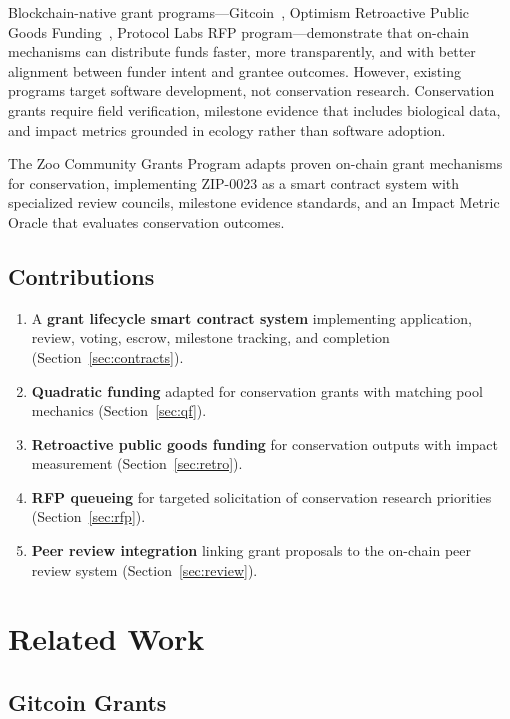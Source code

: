 \documentclass[11pt,letterpaper]{article}
\begin{document}
Blockchain-native grant programs---Gitcoin~\cite{gitcoin2023}, Optimism Retroactive Public Goods Funding~\cite{optimism2023retropgf}, Protocol Labs RFP program---demonstrate that on-chain mechanisms can distribute funds faster, more transparently, and with better alignment between funder intent and grantee outcomes. However, existing programs target software development, not conservation research. Conservation grants require field verification, milestone evidence that includes biological data, and impact metrics grounded in ecology rather than software adoption.

The Zoo Community Grants Program adapts proven on-chain grant mechanisms for conservation, implementing ZIP-0023 as a smart contract system with specialized review councils, milestone evidence standards, and an Impact Metric Oracle that evaluates conservation outcomes.

\subsection{Contributions}

\begin{enumerate}
    \item A \textbf{grant lifecycle smart contract system} implementing application, review, voting, escrow, milestone tracking, and completion (Section~\ref{sec:contracts}).
    \item \textbf{Quadratic funding} adapted for conservation grants with matching pool mechanics (Section~\ref{sec:qf}).
    \item \textbf{Retroactive public goods funding} for conservation outputs with impact measurement (Section~\ref{sec:retro}).
    \item \textbf{RFP queueing} for targeted solicitation of conservation research priorities (Section~\ref{sec:rfp}).
    \item \textbf{Peer review integration} linking grant proposals to the on-chain peer review system (Section~\ref{sec:review}).
\end{enumerate}

\section{Related Work}
\label{sec:related}

\subsection{Gitcoin Grants}
\end{document}
